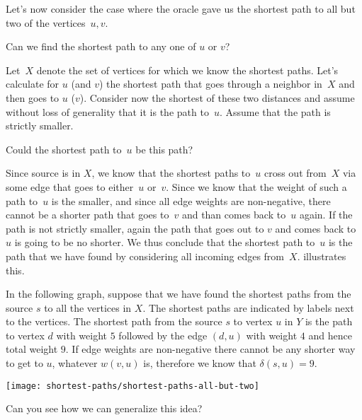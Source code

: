 \begin{notesonly}
Let's now consider the case where the oracle gave us the shortest path
to all but two of the vertices~$u,v$. 
\begin{question}
 Can we find the shortest path to any one of $u$ or $v$?
\end{question}

Let~$X$ denote the set of vertices for which we know the shortest
paths.
%
Let's calculate for $u$ (and $v$) the shortest path that goes through
a neighbor in~$X$ and then goes to $u$ ($v$). Consider now the
shortest of these two distances and assume without loss of generality
that it is the path to~$u$.  Assume that the path is strictly smaller.

\begin{question}
Could the shortest path to~$u$ be this path? 
\end{question}

Since source is in $X$, we know that the shortest paths to~$u$ cross
out from~$X$ via some edge that goes to either~$u$ or~$v$. Since we
know that the weight of such a path to~$u$ is the smaller, and since
all edge weights are non-negative, there cannot be a shorter path that
goes to~$v$ and than comes back to~$u$ again.  
%
If the path is not strictly smaller, again the path that goes out to
$v$ and comes back to $u$ is going to be no shorter.
%
We thus conclude that the shortest path to~$u$ is the path that we
have found by considering all incoming edges
from~$X$.  illustrates this.


\begin{example}
\label{ex:shortestpath::allbuttwo}
In the following graph, suppose that we have found the shortest paths
from the source $s$ to all the vertices in $X$.  The shortest paths
are indicated by labels next to the vertices.  
%
The shortest path from the source $s$ to vertex $u$ in $Y$ is the
path to vertex $d$ with weight $5$ followed by the edge $(d,u)$ with
weight $4$ and hence total weight $9$.  
%
If edge weights are non-negative there cannot be any shorter way to
get to $u$, whatever $w(v,u)$ is, therefore we know that $\delta(s,u)
= 9$.
\begin{center}
\texttt{[image: shortest-paths/shortest-paths-all-but-two]}
\end{center}

\end{example}

\begin{question}
Can you see how we can generalize this idea?  
\end{question}

\end{notesonly}


